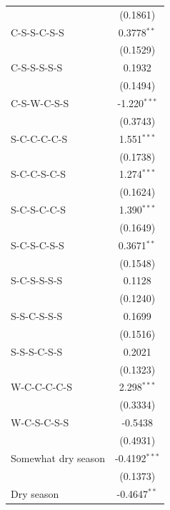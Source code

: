 \begin{table}[H]
\begin{tabular}{lc}
                                      & (0.1861)\\   
      C-S-S-C-S-S                     & 0.3778$^{**}$\\   
                                      & (0.1529)\\   
      C-S-S-S-S-S                     & 0.1932\\   
                                      & (0.1494)\\   
      C-S-W-C-S-S                     & -1.220$^{***}$\\   
                                      & (0.3743)\\   
      S-C-C-C-C-S                     & 1.551$^{***}$\\   
                                      & (0.1738)\\   
      S-C-C-S-C-S                     & 1.274$^{***}$\\   
                                      & (0.1624)\\   
      S-C-S-C-C-S                     & 1.390$^{***}$\\   
                                      & (0.1649)\\   
      S-C-S-C-S-S                     & 0.3671$^{**}$\\   
                                      & (0.1548)\\   
      S-C-S-S-S-S                     & 0.1128\\   
                                      & (0.1240)\\   
      S-S-C-S-S-S                     & 0.1699\\   
                                      & (0.1516)\\   
      S-S-S-C-S-S                     & 0.2021\\   
                                      & (0.1323)\\   
      W-C-C-C-C-S                     & 2.298$^{***}$\\   
                                      & (0.3334)\\   
      W-C-S-C-S-S                     & -0.5438\\   
                                      & (0.4931)\\   
      Somewhat dry season             & -0.4192$^{***}$\\   
                                      & (0.1373)\\   
      Dry season                      & -0.4647$^{**}$\\   

\end{tabular}
\end{table}

